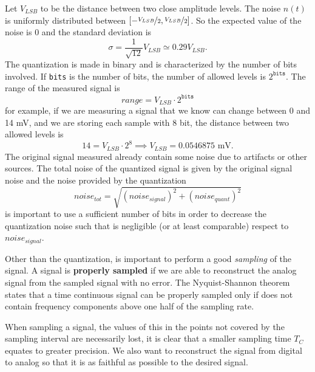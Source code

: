 \documentclass[10pt, letterpaper]{report}
\begin{document}
Let $V_{LSB}$ to be the distance between two close amplitude levels. The noise $n(t)$ is uniformly distributed between $[-\nicefrac{V_{LSB}}{2},\nicefrac{V_{LSB}}{2}]$. So the expected value of the noise is 0 and the standard deviation is $$\sigma=\frac{1}{\sqrt{12}}V_{LSB}\simeq 0.29V_{LSB}.$$
The quantization is made in binary and is characterized by the number of bits involved. If \texttt{bits} is the number of bits, the number of allowed levels is $2^{\texttt{bits}}$. The range of the measured signal is\begin{equation}
     range=V_{LSB}\cdot 2^{\texttt{bits}}
\end{equation}
for example, if we are measuring a signal that we know can change between 0 and 14 mV, and we are storing each  sample with 8 bit, the distance between two allowed levels is\begin{equation}
      14=V_{LSB}\cdot 2^{8}\implies V_{LSB}=0.0546875 \text{ mV}.
\end{equation}
The original signal measured already contain some noise due to artifacts or other sources. The total noise of the quantized signal is given by the original signal noise and the noise provided by the quantization\begin{equation}
     noise_{tot}=\sqrt{(noise_{signal})^2+(noise_{quant})^2}
\end{equation}
is important to use a sufficient number of bits in order to decrease the quantization noise such that is negligible (or at least comparable) respect to $noise_{signal}$.\bigskip 

Other than the quantization, is important to perform a good \textit{sampling} of the signal. A signal is \textbf{properly sampled} if we are able to reconstruct the analog signal from the sampled signal with no error.
The Nyquist-Shannon theorem states that 
a time continuous signal can be properly sampled only if does not contain frequency components above one half of the sampling rate.\bigskip

When sampling a signal, the values of this in the points not covered by the sampling interval are necessarily lost, it is clear that a smaller sampling time $T_C$ equates to greater precision. We also want to reconstruct the signal from digital to analog so that it is as faithful as possible to the desired signal.\bigskip
\end{document}
